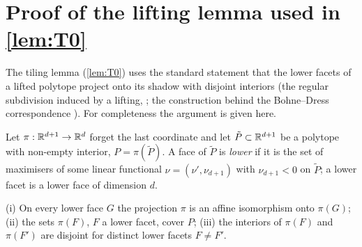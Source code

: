 \section{Proof of the lifting lemma used in \texorpdfstring{\cref{lem:T0}}{Lemma 7.2}}\label{app:lifting}
The tiling lemma (\cref{lem:T0}) uses the standard statement that the lower facets of a lifted polytope project onto its shadow with disjoint interiors (the regular subdivision induced by a lifting, \cite{Ziegler1995,DLRS2010}; the construction behind the Bohne--Dress correspondence \cite{Bohne1992,RGZ1994,HRS2000,BLSWZ1999}). For completeness the argument is given here.

Let $\pi:\mathbb R^{d+1}\to\mathbb R^d$ forget the last coordinate and let $\tilde P\subset\mathbb R^{d+1}$ be a polytope with non-empty interior, $P=\pi(\tilde P)$. A face of $\tilde P$ is \emph{lower} if it is the set of maximisers of some linear functional $\nu=(\nu',\nu_{d+1})$ with $\nu_{d+1}<0$ on $\tilde P$; a lower facet is a lower face of dimension $d$.
\begin{lemma}[lifting]\label{lem:lift}
(i) On every lower face $G$ the projection $\pi$ is an affine isomorphism onto $\pi(G)$; (ii) the sets $\pi(F)$, $F$ a lower facet, cover $P$; (iii) the interiors of $\pi(F)$ and $\pi(F')$ are disjoint for distinct lower facets $F\ne F'$.
\end{lemma}
